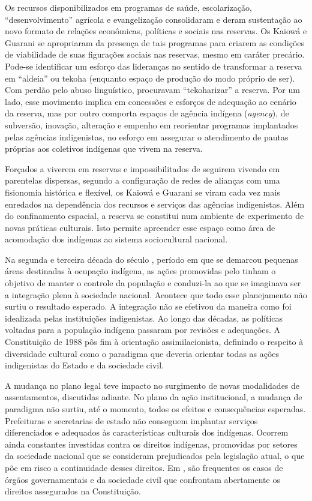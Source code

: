 Os recursos disponibilizados em programas de saúde, escolarização,
``desenvolvimento'' agrícola e evangelização consolidaram e deram
sustentação ao novo formato de relações econômicas, políticas e sociais
nas reservas. Os Kaiowá e Guarani se apropriaram da presença de tais
programas para criarem as condições de viabilidade de suas figurações
sociais nas reservas, mesmo em caráter precário. Pode-se identificar um
esforço das lideranças no sentido de transformar a reserva em ``aldeia''
ou tekoha (enquanto espaço de produção do modo próprio de ser). Com
perdão pelo abuso linguístico, procuravam ``tekoharizar'' a reserva. Por
um lado, esse movimento implica em concessões e esforços de adequação
ao cenário da reserva, mas por outro comporta espaços de agência
indígena (\emph{agency}), de subversão, inovação, alteração e empenho em
reorientar programas implantados pelas agências indigenistas, no
esforço em assegurar o atendimento de pautas próprias aos coletivos
indígenas que vivem na reserva.  

Forçados a viverem em reservas e impossibilitados de seguirem vivendo em
parentelas dispersas, segundo a configuração de redes de alianças com
uma fisionomia histórica e flexível, os Kaiowá e Guarani se viram cada
vez mais enredados na dependência dos recursos e serviços das agências
indigenistas. Além do confinamento espacial, a reserva se constitui num
ambiente de experimento de novas práticas culturais. Isto permite
apreender esse espaço como área de acomodação dos indígenas ao sistema
sociocultural nacional.

Na segunda e terceira década do século , período em que se demarcou
pequenas áreas destinadas à ocupação indígena, as ações promovidas pelo
 tinham o objetivo de manter o controle da população e conduzi-la ao
que se imaginava ser a integração plena à sociedade nacional. Acontece
que todo esse planejamento não surtiu o resultado esperado. A
integração não se efetivou da maneira como foi idealizada pelas
instituições indigenistas. Ao longo das décadas, as políticas voltadas
para a população indígena passaram por revisões e adequações. A
Constituição de 1988 pôs fim à orientação assimilacionista, definindo o
respeito à diversidade cultural como o paradigma que deveria orientar
todas as ações indigenistas do Estado e da sociedade civil. 

A mudança no plano legal teve impacto no surgimento de novas modalidades
de assentamentos, discutidas adiante. No plano da ação institucional, a
mudança de paradigma não surtiu, até o momento, todos os efeitos e
consequências esperadas. Prefeituras e secretarias de estado não
conseguem implantar serviços diferenciados e adequados às
características culturais dos indígenas. Ocorrem ainda constantes
investidas contra os direitos indígenas, promovidas por setores da
sociedade nacional que se consideram prejudicados pela legislação
atual, o que põe em risco a continuidade desses direitos. Em , são
frequentes os casos de órgãos governamentais e da sociedade civil que
confrontam abertamente os direitos assegurados na Constituição.

